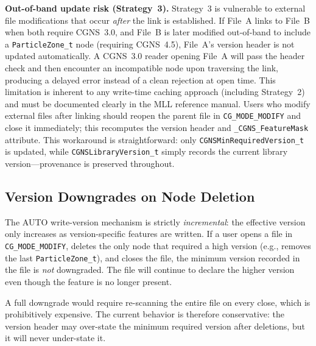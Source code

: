 \documentclass[11pt,letterpaper]{article}
\begin{document}
\textbf{Out-of-band update risk (Strategy~3).}
Strategy~3 is vulnerable to external file modifications that occur
\emph{after} the link is established.  If File~A links to File~B
when both require CGNS~3.0, and File~B is later modified out-of-band
to include a \texttt{ParticleZone\_t} node (requiring CGNS~4.5),
File~A's version header is not updated automatically.  A CGNS~3.0
reader opening File~A will pass the header check and then encounter
an incompatible node upon traversing the link, producing a delayed
error instead of a clean rejection at open time.  This limitation is
inherent to any write-time caching approach (including Strategy~2)
and must be documented clearly in the MLL reference manual.  Users
who modify external files after linking should reopen the parent file
in \texttt{CG\_MODE\_MODIFY} and close it immediately; this
recomputes the version header and \texttt{\_CGNS\_FeatureMask}
attribute.  This workaround is straightforward:
only \texttt{CGNSMinRequiredVersion\_t} is updated, while
\texttt{CGNSLibraryVersion\_t} simply records the current library
version---provenance is preserved throughout.

\subsection{Version Downgrades on Node Deletion}

The AUTO write-version mechanism is strictly \emph{incremental}: the
effective version only increases as version-specific features are
written.  If a user opens a file in \texttt{CG\_MODE\_MODIFY},
deletes the only node that required a high version (e.g., removes the
last \texttt{ParticleZone\_t}), and closes the file, the minimum
version recorded in the file is \emph{not} downgraded.  The file will
continue to declare the higher version even though the feature is no
longer present.

A full downgrade would require re-scanning the entire file on every
close, which is prohibitively expensive.  The current behavior is
therefore conservative: the version header may over-state the minimum
required version after deletions, but it will never under-state it.
\end{document}
